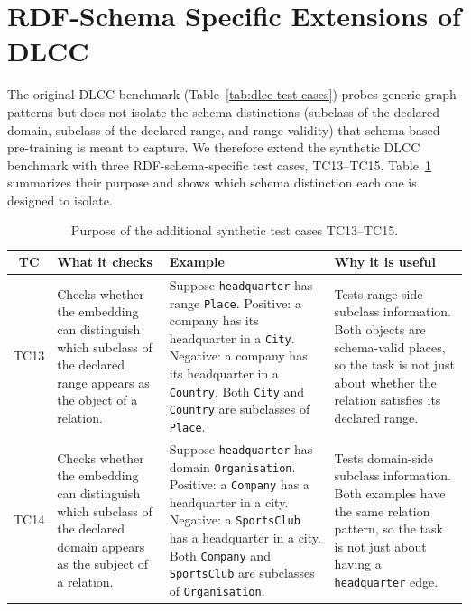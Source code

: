 \documentclass[a4paper,oneside,bibliography=totoc]{scrbook}
\begin{document}
\section{RDF-Schema Specific Extensions of DLCC}
\label{sec:new_tcs}

The original DLCC benchmark (Table~\ref{tab:dlcc-test-cases}) probes generic
graph patterns but does not isolate the schema distinctions (subclass of the
declared domain, subclass of the declared range, and range validity) that
schema-based pre-training is meant to capture. We therefore extend the
synthetic DLCC benchmark with three RDF-schema-specific test cases,
TC13--TC15. Table~\ref{tab:tc13-tc15-motivation} summarizes their purpose and
shows which schema distinction each one is designed to isolate.


\begin{table}[htbp]
  \centering
  \caption{Purpose of the additional synthetic test cases TC13--TC15.}
  \label{tab:tc13-tc15-motivation}
  \small
  \renewcommand{\arraystretch}{1.25}
  \begin{tabularx}{\textwidth}{@{}c >{\raggedright\arraybackslash}X >{\raggedright\arraybackslash}X >{\raggedright\arraybackslash}X@{}}
      \toprule
      \textbf{TC} &
      \textbf{What it checks} &
      \textbf{Example} &
      \textbf{Why it is useful} \\
      \midrule

      TC13 &
      Checks whether the embedding can distinguish which subclass of the declared range appears as the object of a relation. &
      Suppose \texttt{headquarter} has range \texttt{Place}. \newline
      Positive: a company has its headquarter in a \texttt{City}. \newline
      Negative: a company has its headquarter in a \texttt{Country}. \newline
      Both \texttt{City} and \texttt{Country} are subclasses of \texttt{Place}. &
      Tests range-side subclass information. Both objects are schema-valid places, so the task is not just about whether the relation satisfies its declared range. \\

      \addlinespace

      TC14 &
      Checks whether the embedding can distinguish which subclass of the declared domain appears as the subject of a relation. &
      Suppose \texttt{headquarter} has domain \texttt{Organisation}. \newline
      Positive: a \texttt{Company} has a headquarter in a city. \newline
      Negative: a \texttt{SportsClub} has a headquarter in a city. \newline
      Both \texttt{Company} and \texttt{SportsClub} are subclasses of \texttt{Organisation}. &
      Tests domain-side subclass information. Both examples have the same relation pattern, so the task is not just about having a \texttt{headquarter} edge. \\


\end{tabularx}
\end{table}
\end{document}
